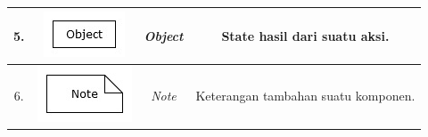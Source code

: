 \begin{table}[htbp]
\begin{center}
\begin{tabular}{|c|c|c|c| }
            5. & \begin{minipage}{.2\textwidth}
                \includegraphics[width=\linewidth]{bab2/gambar/uml/object.jpg}
            \end{minipage} & \textit{Object}  & State hasil dari suatu aksi.              \\ \hline

            6. & \begin{minipage}{.2\textwidth}
                \includegraphics[width=\linewidth]{bab2/gambar/uml/note.jpg}
            \end{minipage} & \textit{Note}  & Keterangan tambahan suatu komponen.              \\ \hline
        \end{tabular}
    \end{center}
\end{table}